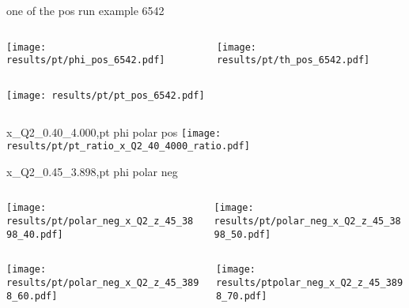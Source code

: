 \begin{frame}{one of the pos run example 6542}
\begin{columns}
\begin{column}[T]{0.5\textwidth}
\texttt{[image: results/pt/phi\_pos\_6542.pdf]}
\end{column}
\begin{column}[T]{0.5\textwidth}
\texttt{[image: results/pt/th\_pos\_6542.pdf]}
\end{column}
\end{columns}
\begin{columns}
\begin{column}[T]{0.5\textwidth}
\texttt{[image: results/pt/pt\_pos\_6542.pdf]}
\end{column}
\begin{column}[T]{0.5\textwidth}
\end{column}
\end{columns}
\end{frame}
\begin{frame}{x\_Q2\_0.40\_4.000,pt phi polar pos}
\texttt{[image: results/pt/pt\_ratio\_x\_Q2\_40\_4000\_ratio.pdf]}
\end{frame}
\begin{frame}{x\_Q2\_0.45\_3.898,pt phi polar neg}
\begin{columns}
\begin{column}[T]{0.5\textwidth}
\texttt{[image: results/pt/polar\_neg\_x\_Q2\_z\_45\_3898\_40.pdf]}
\end{column}
\begin{column}[T]{0.5\textwidth}
\texttt{[image: results/pt/polar\_neg\_x\_Q2\_z\_45\_3898\_50.pdf]}
\end{column}
\end{columns}
\begin{columns}
\begin{column}[T]{0.5\textwidth}
\texttt{[image: results/pt/polar\_neg\_x\_Q2\_z\_45\_3898\_60.pdf]}
\end{column}
\begin{column}[T]{0.5\textwidth}
\texttt{[image: results/ptpolar\_neg\_x\_Q2\_z\_45\_3898\_70.pdf]}
\end{column}
\end{columns}
\end{frame}
